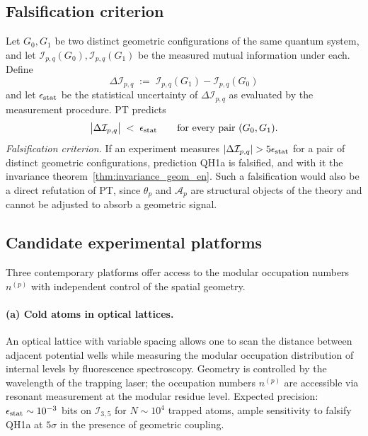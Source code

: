 \subsection{Falsification criterion}
\label{ssec:qh1a_falsification_en}

Let $G_0, G_1$ be two distinct geometric configurations of the
same quantum system, and let
$\mathcal{I}_{p,q}(G_0), \mathcal{I}_{p,q}(G_1)$ be the measured
mutual information under each. Define
\begin{equation}
  \Delta\mathcal{I}_{p,q}
  \;:=\;
  \mathcal{I}_{p,q}(G_1) - \mathcal{I}_{p,q}(G_0)
  \label{eq:Delta_I_def_en}
\end{equation}
and let $\epsilon_{\rm stat}$ be the statistical uncertainty of
$\Delta\mathcal{I}_{p,q}$ as evaluated by the measurement
procedure. PT predicts
\begin{equation}
  \bigl|\Delta\mathcal{I}_{p,q}\bigr| \;<\; \epsilon_{\rm stat}
  \qquad \text{for every pair }(G_0, G_1).
  \label{eq:QH1a_predict_en}
\end{equation}
\emph{Falsification criterion.} If an experiment measures
$|\Delta\mathcal{I}_{p,q}| > 5 \epsilon_{\rm stat}$ for a pair of
distinct geometric configurations, prediction QH1a is falsified,
and with it the invariance
theorem~\ref{thm:invariance_geom_en}. Such a falsification would
also be a direct refutation of PT, since $\theta_p$ and
$\mathcal{A}_p$ are structural objects of the theory and cannot
be adjusted to absorb a geometric signal.

\subsection{Candidate experimental platforms}
\label{ssec:qh1a_platforms_en}

Three contemporary platforms offer access to the modular
occupation numbers $n^{(p)}$ with independent control of the
spatial geometry.

\paragraph{(a) Cold atoms in optical lattices.}
An optical lattice with variable spacing allows one to scan the
distance between adjacent potential wells while measuring the
modular occupation distribution of internal levels by fluorescence
spectroscopy. Geometry is controlled by the wavelength of the
trapping laser; the occupation numbers $n^{(p)}$ are accessible
via resonant measurement at the modular residue level. Expected
precision: $\epsilon_{\rm stat} \sim 10^{-3}$ bits on
$\mathcal{I}_{3,5}$ for $N \sim 10^4$ trapped atoms, ample
sensitivity to falsify QH1a at $5\sigma$ in the presence of
geometric coupling.

